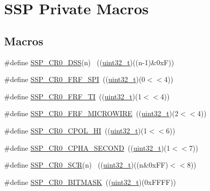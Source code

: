 \hypertarget{group___s_s_p___private___macros}{}\section{S\+SP Private Macros}
\label{group___s_s_p___private___macros}
\subsection*{Macros}
\begin{DoxyCompactItemize}
\item 
\#define \hyperlink{group___s_s_p___private___macros_gac08fdfb1d7152206ec8a46ae361ceee3}{S\+S\+P\+\_\+\+C\+R0\+\_\+\+D\+SS}(n)   	~((\hyperlink{_p_e___types_8h_a33594304e786b158f3fb30289278f5af}{uint32\+\_\+t})((n-\/1)\&0x\+F))
\item 
\#define \hyperlink{group___s_s_p___private___macros_ga4f0f58a8f4b87af0f18e84b981c31a74}{S\+S\+P\+\_\+\+C\+R0\+\_\+\+F\+R\+F\+\_\+\+S\+PI}~((\hyperlink{_p_e___types_8h_a33594304e786b158f3fb30289278f5af}{uint32\+\_\+t})(0$<$$<$4))
\item 
\#define \hyperlink{group___s_s_p___private___macros_ga54c718a1a75a1e5e06417b9f8267ee27}{S\+S\+P\+\_\+\+C\+R0\+\_\+\+F\+R\+F\+\_\+\+TI}~((\hyperlink{_p_e___types_8h_a33594304e786b158f3fb30289278f5af}{uint32\+\_\+t})(1$<$$<$4))
\item 
\#define \hyperlink{group___s_s_p___private___macros_ga7ca858fcf0f529a38e1e1bf0a69d4486}{S\+S\+P\+\_\+\+C\+R0\+\_\+\+F\+R\+F\+\_\+\+M\+I\+C\+R\+O\+W\+I\+RE}~((\hyperlink{_p_e___types_8h_a33594304e786b158f3fb30289278f5af}{uint32\+\_\+t})(2$<$$<$4))
\item 
\#define \hyperlink{group___s_s_p___private___macros_ga36d7ad75edb14d318d710f964384f466}{S\+S\+P\+\_\+\+C\+R0\+\_\+\+C\+P\+O\+L\+\_\+\+HI}~((\hyperlink{_p_e___types_8h_a33594304e786b158f3fb30289278f5af}{uint32\+\_\+t})(1$<$$<$6))
\item 
\#define \hyperlink{group___s_s_p___private___macros_gae4150d0b2513ff70568be15c2170c9ea}{S\+S\+P\+\_\+\+C\+R0\+\_\+\+C\+P\+H\+A\+\_\+\+S\+E\+C\+O\+ND}~((\hyperlink{_p_e___types_8h_a33594304e786b158f3fb30289278f5af}{uint32\+\_\+t})(1$<$$<$7))
\item 
\#define \hyperlink{group___s_s_p___private___macros_ga325ac8b499d6345b7b363d6f886b2046}{S\+S\+P\+\_\+\+C\+R0\+\_\+\+S\+CR}(n)   	~((\hyperlink{_p_e___types_8h_a33594304e786b158f3fb30289278f5af}{uint32\+\_\+t})((n\&0x\+F\+F)$<$$<$8))
\item 
\#define \hyperlink{group___s_s_p___private___macros_ga90be93bebdbdfee011d90ea6e054260a}{S\+S\+P\+\_\+\+C\+R0\+\_\+\+B\+I\+T\+M\+A\+SK}~((\hyperlink{_p_e___types_8h_a33594304e786b158f3fb30289278f5af}{uint32\+\_\+t})(0x\+F\+F\+F\+F))

\end{DoxyCompactItemize}
